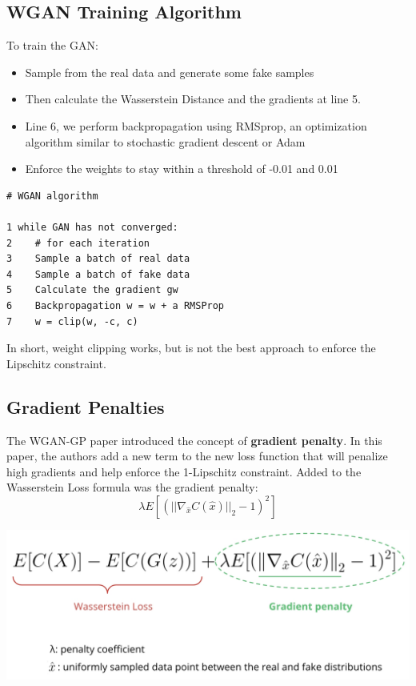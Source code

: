 \subsection{WGAN Training Algorithm}
To train the GAN:
\begin{itemize}
    \item Sample from the real data and generate some fake samples
    \item Then calculate the Wasserstein Distance and the gradients at line 5.
    \item Line 6, we perform backpropagation using RMSprop, an optimization algorithm similar to stochastic gradient descent or Adam
    \item Enforce the weights to stay within a threshold of -0.01 and 0.01
\end{itemize}
\begin{lstlisting}
# WGAN algorithm

1 while GAN has not converged:
2    # for each iteration
3    Sample a batch of real data
4    Sample a batch of fake data
5    Calculate the gradient gw
6    Backpropagation w = w + a RMSProp
7    w = clip(w, -c, c)
\end{lstlisting}
In short, weight clipping works, but is not the best approach to enforce the Lipschitz constraint.
\subsection{Gradient Penalties}
The WGAN-GP paper introduced the concept of \textbf{gradient penalty}. In this paper, the authors add a new term to the new loss function that will penalize high gradients and help enforce the 1-Lipschitz constraint. Added to the Wasserstein Loss formula was the gradient penalty:  \[\lambda E[(||\nabla_{\hat{x}} C(\hat{x})||_2- 1)^2]\]

\includegraphics[width=1\linewidth]{img//genAdvNet//modernGAN/screen-shot-2022-06-29-at-4.56.30-pm.jpeg}

